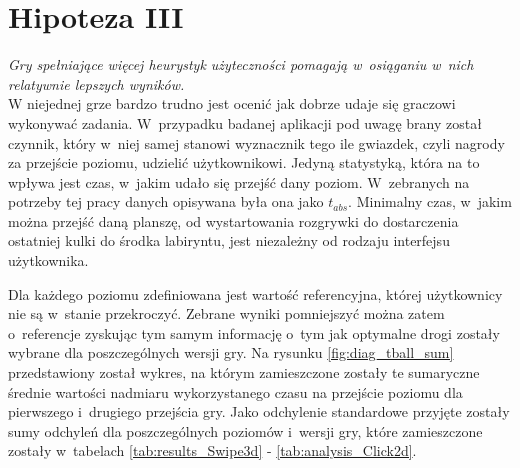 \documentclass[a4paper,12pt,numbers=noenddot]{report}
\begin{document}
\section{Hipoteza III}
\textit{Gry spełniające więcej heurystyk użyteczności pomagają w~osiąganiu w~nich relatywnie lepszych wyników.}\\

W niejednej grze bardzo trudno jest ocenić jak dobrze udaje się graczowi wykonywać zadania. W~przypadku badanej aplikacji pod uwagę brany został czynnik, który w~niej samej stanowi wyznacznik tego ile gwiazdek, czyli nagrody za przejście poziomu, udzielić użytkownikowi. Jedyną statystyką, która na to wpływa jest czas, w~jakim udało się przejść dany poziom. W~zebranych na potrzeby tej pracy danych opisywana była ona jako $t_{abs}$. Minimalny czas, w~jakim można przejść daną planszę, od wystartowania rozgrywki do dostarczenia ostatniej kulki do środka labiryntu, jest niezależny od rodzaju interfejsu użytkownika. 

Dla każdego poziomu zdefiniowana jest wartość referencyjna, której użytkownicy nie są w~stanie przekroczyć. Zebrane wyniki pomniejszyć można zatem o~referencje zyskując tym samym informację o~tym jak optymalne drogi zostały wybrane dla poszczególnych wersji gry. Na rysunku \ref{fig:diag_tball_sum} przedstawiony został wykres, na którym zamieszczone zostały te sumaryczne średnie wartości nadmiaru wykorzystanego czasu na przejście poziomu dla pierwszego i~drugiego przejścia gry. Jako odchylenie standardowe przyjęte zostały sumy odchyleń dla poszczególnych poziomów i~wersji gry, które zamieszczone zostały w~tabelach \ref{tab:results_Swipe3d} - \ref{tab:analysis_Click2d}.\\
\end{document}
